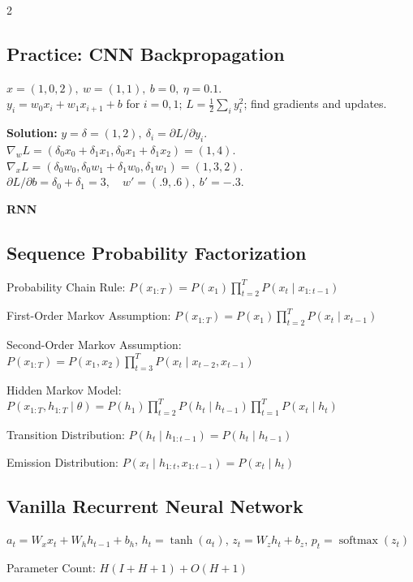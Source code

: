 \documentclass[a4paper]{article}
\newcommand{\module}[1]{\par\needspace{45pt}\addvspace{4pt}\noindent\colorbox{accent}{\parbox{\dimexpr\linewidth-2\fboxsep\relax}{\color{white}\sffamily\bfseries\fontsize{10}{12}\selectfont #1}}\par\vspace{1pt}}
\let\originalsum\sum
\let\originalprod\prod
\renewcommand{\sum}{\mathop{\textstyle\originalsum}\nolimits}
\renewcommand{\prod}{\mathop{\textstyle\originalprod}\nolimits}
\begin{document}
\begin{multicols}{2}
\subsection*{Practice: CNN Backpropagation}
\noindent \(x=(1,0,2),\ w=(1,1),\ b=0,\ \eta=0.1\).\\
\(y_i=w_0x_i+w_1x_{i+1}+b\) for \(i=0,1\); \(L=\frac12\sum_i y_i^2\); find gradients and updates.\par
\noindent \textbf{Solution:} \(y=\delta=(1,2),\ \delta_i=\partial L/\partial y_i\).\\
\(\nabla_w L=(\delta_0x_0+\delta_1x_1,\delta_0x_1+\delta_1x_2)=(1,4)\).\\
\(\nabla_x L=(\delta_0w_0,\delta_0w_1+\delta_1w_0,\delta_1w_1)=(1,3,2)\).\\
\(\partial L/\partial b=\delta_0+\delta_1=3,\quad w'=(.9,.6),\ b'=-.3\).\par
\columnbreak
\module{RNN}
\subsection*{Sequence Probability Factorization}
\noindent Probability Chain Rule: \(\displaystyle P(x_{1:T})=P(x_1)\prod_{t=2}^{T}P(x_t\mid x_{1:t-1})\)\par
\noindent First-Order Markov Assumption: \(\displaystyle P(x_{1:T})=P(x_1)\prod_{t=2}^{T}P(x_t\mid x_{t-1})\)\par
\noindent Second-Order Markov Assumption: \(\displaystyle P(x_{1:T})=P(x_1,x_2)\prod_{t=3}^{T}P(x_t\mid x_{t-2},x_{t-1})\)\par
\noindent Hidden Markov Model: \(\displaystyle P(x_{1:T},h_{1:T}\mid\theta)=P(h_1)\prod_{t=2}^{T}P(h_t\mid h_{t-1})\prod_{t=1}^{T}P(x_t\mid h_t)\)\par
\noindent Transition Distribution: \(\displaystyle P(h_t\mid h_{1:t-1})=P(h_t\mid h_{t-1})\)\par
\noindent Emission Distribution: \(\displaystyle P(x_t\mid h_{1:t},x_{1:t-1})=P(x_t\mid h_t)\)\par
\subsection*{Vanilla Recurrent Neural Network}
\noindent \(\displaystyle a_t=W_xx_t+W_hh_{t-1}+b_h\), \(\displaystyle h_t=\tanh(a_t)\), \(\displaystyle z_t=W_zh_t+b_z\), \(\displaystyle p_t=\operatorname{softmax}(z_t)\)\par
\noindent Parameter Count: \(\displaystyle H(I+H+1)+O(H+1)\)\par

\end{multicols}
\end{document}
